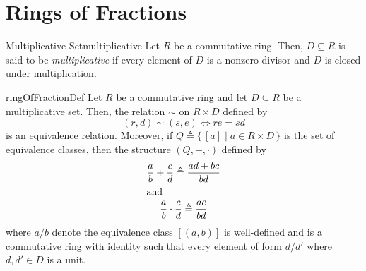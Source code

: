 \documentclass[../modern_algebra.tex]{subfiles}
\begin{document}
\section{Rings of Fractions}

\begin{Definition}[colbacktitle=red!75!black]{Multiplicative Set}{multiplicative}
    Let \(R\) be a commutative ring.
    Then, \(D \subseteq R\) is said to be \textit{multiplicative}
    if every element of \(D\) is a nonzero divisor and \(D\) is
    closed under multiplication.
\end{Definition}

\begin{Lemma}{}{ringOfFractionDef}
    Let \(R\) be a commutative ring and let \(D \subseteq R\) be a multiplicative set.
    Then, the relation \(\sim\) on \(R \times D\) defined by
    \[
        (r, d) \sim (s, e) \iff re = sd
    \]
    is an equivalence relation.
    Moreover, if \(Q \triangleq \{\,[a] \mid a \in R \times D\,\}\) is the set of
    equivalence classes, then the structure \((Q, +, \cdot)\)
    defined by
    \begin{gather*}
        \frac{a}{b} + \frac{c}{d} \triangleq \frac{ad + bc}{bd} \\
        \shortintertext{and}
        \frac{a}{b} \cdot \frac{c}{d} \triangleq \frac{ac}{bd}
    \end{gather*}
    where \(a/b\) denote the equivalence class \([(a, b)]\)
    is well-defined and is a commutative ring with identity such that every element of form \(d/d'\)
    where \(d, d' \in D\) is a unit.
\end{Lemma}
\begin{myproof}[Proof]
    
\end{myproof}
\end{document}
